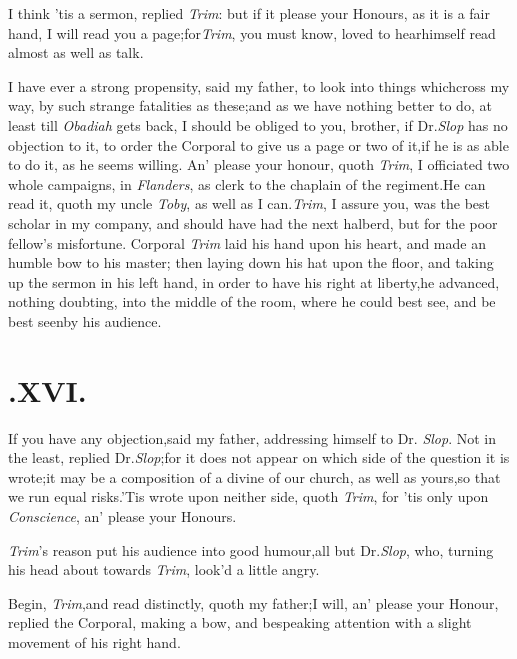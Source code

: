 \documentclass{article}
\begin{document}
I think ’tis a sermon, replied \textit{Trim}:\tsk\break
but if it please your Honours, as it is a fair hand, I will read you a
page;\tsk for\break \textit{Trim}, you must know, loved to
hear\break himself
read almost as well as talk.

I have ever a strong propensity, said my father, to look into
things which\break cross my way, by such strange fatalities\break
as these;\tsk and as we have nothing better to do, at least
till \textit{Obadiah} gets back,
I should be obliged to you, brother, if Dr.\@ \textit{Slop} has no
objection to it, to order the Corporal to give us a page or two of
it,\tsk if he is as able to do it, as he seems willing. An’
please your honour, quoth \textit{Trim}, I officiated two whole
campaigns, in \textit{Flanders}, as clerk to the chaplain of the
regiment.\tsk He can read it, quoth my uncle \textit{Toby},
as well as I can.\tsk \textit{Trim}, I assure you, was the
best scholar in my company, and should have had the next halberd,
but for the poor fellow’s mis\-fortune. Corporal \textit{Trim}
laid his hand upon his heart, and made an humble bow to his
master;\tsk
then laying down his hat upon the floor, and taking up the sermon
in his left hand, in order to have his right at liberty,\tsk he
advanced, nothing doubting, into the middle of the room, where he
could best see, and be best seen\break by his audience.\\
\newpage
\section{.\enspace  XVI.}

\quad\tsh If you have any
objection,\tsk said my father, addressing himself to Dr.\@
\textit{Slop}.\break
Not in the least, replied Dr.\@ \textit{Slop};\tsk for
it does not appear on which side of the question it is
wrote;\tsk it may be a composition of a divine of our church, as
well as yours,\tsk so that we run equal
risks.\tsh ’Tis wrote upon neither side, quoth
\textit{Trim}, for ’tis only upon \textit{Conscience},\break
an’ please your Honours.

\textit{Trim}’s reason put his audience into good
humour,\tsk all but Dr.\@ \textit{Slop}, who,
turning his head about towards \textit{Trim},\break
look’d a little angry.

Begin, \textit{Trim},\tsh and read distinctly, quoth my
father;\tsk I will, an’ please your
Honour, replied the
Corporal, making a bow, and bespeaking attention with a slight
movement of his right hand.
\end{document}
